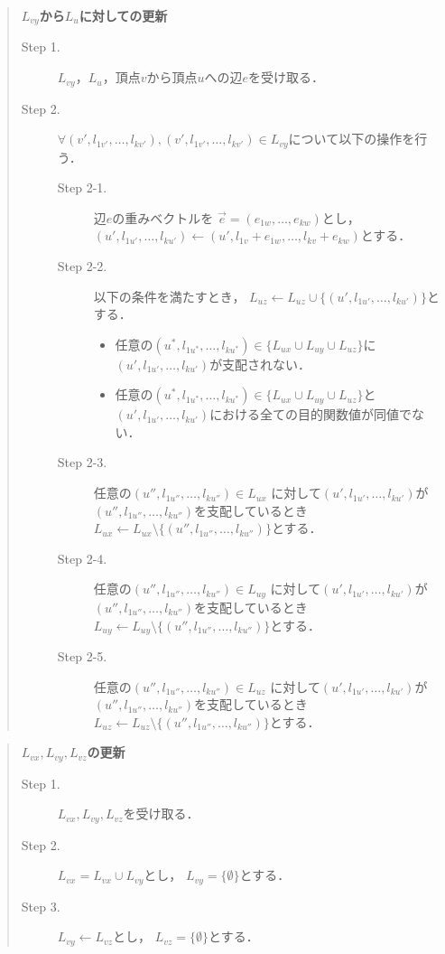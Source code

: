 \documentclass[12pt]{optlab-bachelor}
\begin{document}
\begin{quote}
  \textbf{$L_{vy}$から$L_u$に対しての更新}
  \begin{description}
    \item[Step 1.] $L_{vy}$，$L_u$，頂点$v$から頂点$u$への辺$e$を受け取る．
    \item[Step 2.] $\forall (v',l_{1v'},\ldots,l_{kv'}) ,
    (v',l_{1v'},\ldots,l_{kv'}) \in L_{vy}$について以下の操作を行う．
    \begin{description}
      \item[Step 2-1.] 辺$e$の重みベクトルを
      $\vec{e} = (e_{1w},\ldots,e_{kw})$とし，
      $(u',l_{1u'},\ldots,l_{ku'}) \leftarrow
      (u',l_{1v}+e_{1w},\ldots,l_{kv}+e_{kw})$とする．
      \item[Step 2-2.] 以下の条件を満たすとき，
      $L_{uz} \leftarrow L_{uz} \cup \{(u',l_{1u'},\ldots,l_{ku'})\}$とする．
      \begin{itemize}
        \item 任意の$(u^*,l_{1u^*},\ldots,l_{ku^*})\in \{L_{ux} \cup L_{uy} \cup L_{uz}\}$に
        $(u',l_{1u'},\ldots,l_{ku'})$が支配されない．
        \item 任意の$(u^*,l_{1u^*},\ldots,l_{ku^*}) \in \{L_{ux} \cup L_{uy} \cup L_{uz}\}$と
        $(u',l_{1u'},\ldots,l_{ku'})$における全ての目的関数値が同値でない．
      \end{itemize}
      \item[Step 2-3.] 任意の$(u'',l_{1u''},\ldots,l_{ku''})\in L_{ux}$
      に対して$(u',l_{1u'},\ldots,l_{ku'})$が
      $(u'',l_{1u''},\ldots,l_{ku''})$を支配しているとき
      $L_{ux} \leftarrow L_{ux} \setminus \{(u'',l_{1u''},\ldots,l_{ku''})\}$とする．
      \item[Step 2-4.] 任意の$(u'',l_{1u''},\ldots,l_{ku''})\in L_{uy}$
      に対して$(u',l_{1u'},\ldots,l_{ku'})$が
      $(u'',l_{1u''},\ldots,l_{ku''})$を支配しているとき
      $L_{uy} \leftarrow L_{uy} \setminus \{(u'',l_{1u''},\ldots,l_{ku''})\}$とする．
      \item[Step 2-5.] 任意の$(u'',l_{1u''},\ldots,l_{ku''})\in L_{uz}$
      に対して$(u',l_{1u'},\ldots,l_{ku'})$が
      $(u'',l_{1u''},\ldots,l_{ku''})$を支配しているとき
      $L_{uz} \leftarrow L_{uz} \setminus \{(u'',l_{1u''},\ldots,l_{ku''})\}$とする．
    \end{description}
  \end{description}
\end{quote}

\begin{quote}
  \textbf{$L_{vx},L_{vy},L_{vz}$の更新}
  \begin{description}
    \item[Step 1.] $L_{vx},L_{vy},L_{vz}$を受け取る．
    \item[Step 2.] $L_{vx} = L_{vx} \cup L_{vy}$とし，
    $L_{vy} = \{ \emptyset \}$とする．
    \item[Step 3.] $L_{vy} \leftarrow L_{vz}$とし，
    $L_{vz} = \{ \emptyset \}$とする．
  \end{description}
\end{quote}
\end{document}

